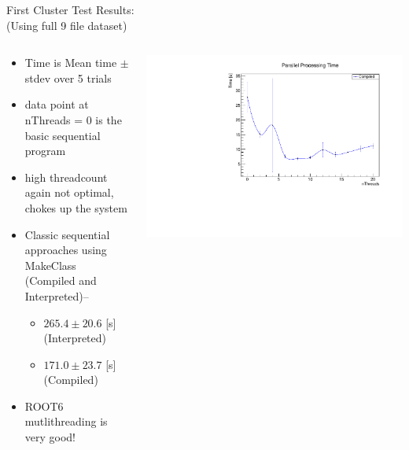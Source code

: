 \documentclass[10pt]{beamer}
\begin{document}
\begin{frame}
First Cluster Test Results:\\
\tiny
(Using full 9 file dataset)\\
\begin{columns}
	\begin{column}{0.5\textwidth}
	\begin{itemize}
		\scriptsize
		\item Time is Mean time $\pm$ stdev over 5 trials
		\item data point at nThreads = 0 is the basic sequential program
		\item high threadcount again not optimal, chokes up the system
		\item Classic sequential approaches using MakeClass (Compiled and Interpreted)--
			\begin{itemize}
				\scriptsize
				\item $265.4 \pm  20.6$ [s] (Interpreted)
				\item $171.0 \pm  23.7$ [s] (Compiled)

			\end{itemize}
		\item ROOT6 mutlithreading is very good!
	\end{itemize}
	\end{column}
	\begin{column}{0.5\textwidth}
   		\includegraphics[scale=0.3, left]{../ParTree_t3/test1plott3.pdf}

	\end{column}
\end{columns}

\end{frame}
\end{document}
